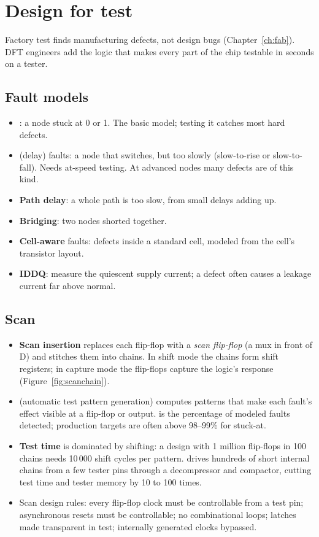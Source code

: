 \section{Design for test}

Factory test finds manufacturing defects, not design bugs (Chapter~\ref{ch:fab}). DFT engineers add the logic that makes every part of the chip testable in seconds on a tester.

\subsection*{Fault models}

\begin{itemize}
  \item {}: a node stuck at 0 or 1. The basic model; testing it catches most hard defects.
  \item {} (delay) faults: a node that switches, but too slowly (slow-to-rise or slow-to-fall). Needs at-speed testing. At advanced nodes many defects are of this kind.
  \item \textbf{Path delay}: a whole path is too slow, from small delays adding up.
  \item \textbf{Bridging}: two nodes shorted together.
  \item \textbf{Cell-aware} faults: defects inside a standard cell, modeled from the cell's transistor layout.
  \item \textbf{IDDQ}: measure the quiescent supply current; a defect often causes a leakage current far above normal.
\end{itemize}

\subsection*{Scan}

\begin{itemize}
  \item \textbf{Scan insertion} replaces each flip-flop with a \emph{scan flip-flop} (a mux in front of D) and stitches them into chains. In shift mode the chains form shift registers; in capture mode the flip-flops capture the logic's response (Figure~\ref{fig:scanchain}).
  \item {} (automatic test pattern generation) computes patterns that make each fault's effect visible at a flip-flop or output.  is the percentage of modeled faults detected; production targets are often above 98--99\% for stuck-at.
  \item \textbf{Test time} is dominated by shifting: a design with 1 million flip-flops in 100 chains needs 10\,000 shift cycles per pattern.  drives hundreds of short internal chains from a few tester pins through a decompressor and compactor, cutting test time and tester memory by 10 to 100 times.
  \item Scan design rules: every flip-flop clock must be controllable from a test pin; asynchronous resets must be controllable; no combinational loops; latches made transparent in test; internally generated clocks bypassed.
\end{itemize}

